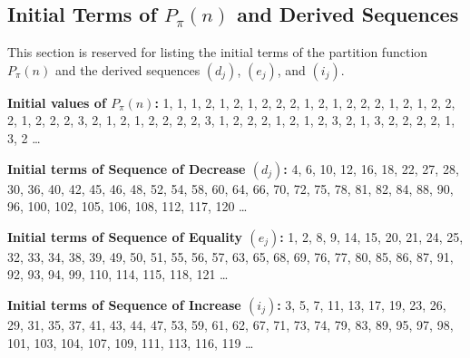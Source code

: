 \documentclass[]{article}
\theoremstyle{plain}%
\theoremstyle{definition}
\theoremstyle{remark}
\begin{document}
	\subsection{Initial Terms of $P_{\pi}(n)$ and Derived Sequences}
	\label{subsec:initial_terms}
	This section is reserved for listing the initial terms of the partition function $P_{\pi}(n)$ and the derived sequences $(d_j)$, $(e_j)$, and $(i_j)$.
	
	\noindent \textbf{Initial values of $P_{\pi}(n)$:}
	1, 1, 1, 2, 1, 2, 1, 2, 2, 2, 1, 2, 1, 2, 2, 2, 1, 2, 1, 2, 2, 2, 1, 2, 2, 2, 3, 2, 1, 2, 1, 2, 2, 2, 2, 3, 1, 2, 2, 2, 1, 2, 1, 2, 3, 2, 1, 3, 2, 2, 2, 2, 1, 3, 2 \dots
	
	\noindent \textbf{Initial terms of Sequence of Decrease $(d_j)$:}
	4, 6, 10, 12, 16, 18, 22, 27, 28, 30, 36, 40, 42, 45, 46, 48, 52, 54, 58, 60, 64, 66, 70, 72, 75, 78, 81, 82, 84, 88, 90, 96, 100, 102, 105, 106, 108, 112, 117, 120 \dots
	
	\noindent \textbf{Initial terms of Sequence of Equality $(e_j)$:}
	1, 2, 8, 9, 14, 15, 20, 21, 24, 25, 32, 33, 34, 38, 39, 49, 50, 51, 55, 56, 57, 63, 65, 68, 69, 76, 77, 80, 85, 86, 87, 91, 92, 93, 94, 99, 110, 114, 115, 118, 121 \dots
	
	\noindent \textbf{Initial terms of Sequence of Increase $(i_j)$:}
	3, 5, 7, 11, 13, 17, 19, 23, 26, 29, 31, 35, 37, 41, 43, 44, 47, 53, 59, 61, 62, 67, 71, 73, 74, 79, 83, 89, 95, 97, 98, 101, 103, 104, 107, 109, 111, 113, 116, 119 \dots
	
	
\end{document}
